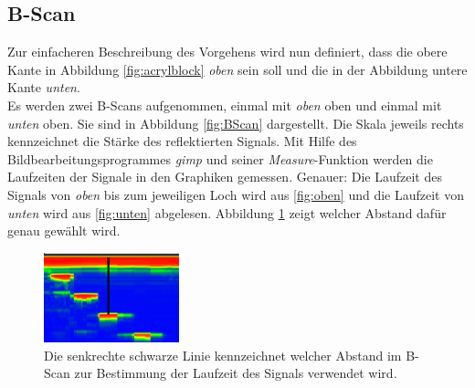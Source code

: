  
 
 
 
\subsection{B-Scan\label{sec:BScan}}
Zur einfacheren Beschreibung des Vorgehens wird nun definiert, dass die obere Kante in Abbildung \ref{fig:acrylblock} \emph{oben} sein soll und die in der Abbildung untere Kante \emph{unten}. \\
Es werden zwei B-Scans aufgenommen, einmal mit \emph{oben} oben und einmal mit \emph{unten} oben. Sie sind in Abbildung \ref{fig:BScan} dargestellt. Die Skala jeweils rechts kennzeichnet die Stärke des reflektierten Signals. Mit Hilfe des Bildbearbeitungsprogrammes \emph{gimp} und seiner \emph{Measure}-Funktion werden die Laufzeiten der Signale in den Graphiken gemessen. Genauer: Die Laufzeit des Signals von \emph{oben} bis zum jeweiligen Loch wird aus \ref{fig:oben} und die Laufzeit von \emph{unten} wird aus \ref{fig:unten} abgelesen. Abbildung \ref{fig:Schema} zeigt welcher Abstand dafür genau gewählt wird.
\begin{figure}[h!]
	\centering
	\includegraphics[width=0.35\textwidth]{Schema.png}
	\caption{Die senkrechte schwarze Linie kennzeichnet welcher Abstand im B-Scan zur Bestimmung der Laufzeit des Signals verwendet wird.}
	\label{fig:Schema}
\end{figure} \\
